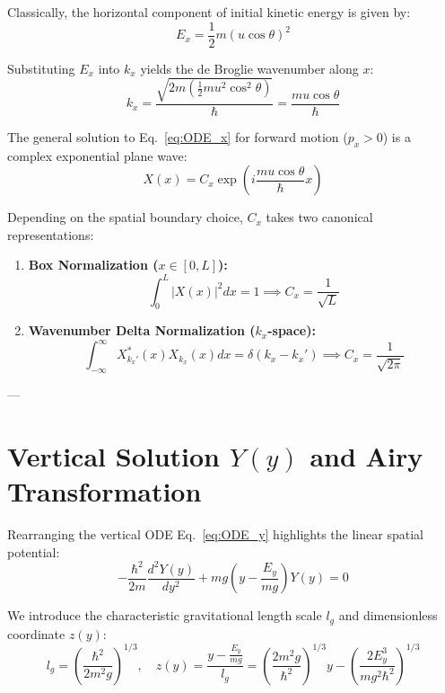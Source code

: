 \documentclass[11pt, a4paper]{article}
\begin{document}
Classically, the horizontal component of initial kinetic energy is given by:
\begin{equation}
E_x = \frac{1}{2} m (u \cos\theta)^2
\end{equation}

Substituting $E_x$ into $k_x$ yields the de Broglie wavenumber along $x$:
\begin{equation}
k_x = \frac{\sqrt{2m \left(\frac{1}{2} m u^2 \cos^2\theta\right)}}{\hbar} = \frac{m u \cos\theta}{\hbar}
\end{equation}

The general solution to Eq.~\eqref{eq:ODE_x} for forward motion ($p_x > 0$) is a complex exponential plane wave:
\begin{equation}
X(x) = C_x \exp\left( i \frac{m u \cos\theta}{\hbar} x \right)
\end{equation}

Depending on the spatial boundary choice, $C_x$ takes two canonical representations:
\begin{enumerate}
    \item \textbf{Box Normalization ($x \in [0, L]$):}
    \begin{equation}
    \int_{0}^{L} |X(x)|^2 dx = 1 \implies C_x = \frac{1}{\sqrt{L}}
    \end{equation}
    \item \textbf{Wavenumber Delta Normalization ($k_x$-space):}
    \begin{equation}
    \int_{-\infty}^{\infty} X_{k_x'}^*(x) X_{k_x}(x) dx = \delta(k_x - k_x') \implies C_x = \frac{1}{\sqrt{2\pi}}
    \end{equation}
\end{enumerate}

---

\section{Vertical Solution $Y(y)$ and Airy Transformation}

Rearranging the vertical ODE Eq.~\eqref{eq:ODE_y} highlights the linear spatial potential:
\begin{equation}
-\frac{\hbar^2}{2m} \frac{d^2 Y(y)}{dy^2} + mg \left( y - \frac{E_y}{mg} \right) Y(y) = 0
\end{equation}

We introduce the characteristic gravitational length scale $l_g$ and dimensionless coordinate $z(y)$:
\begin{equation}
l_g = \left( \frac{\hbar^2}{2 m^2 g} \right)^{1/3}, \quad z(y) = \frac{y - \frac{E_y}{mg}}{l_g} = \left(\frac{2m^2 g}{\hbar^2}\right)^{1/3} y - \left( \frac{2 E_y^3}{m g^2 \hbar^2} \right)^{1/3}
\end{equation}
\end{document}
